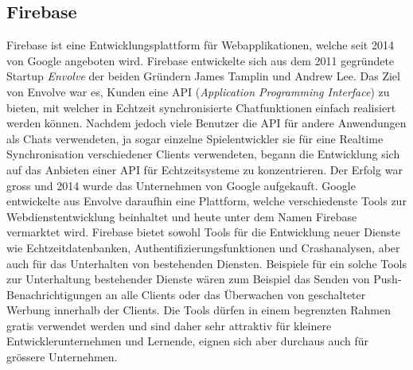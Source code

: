 \documentclass[../main.tex]{subfiles}
\begin{document}
	\subsection{Firebase} \label{DieFirebaseDatenbank}
	Firebase ist eine  Entwicklungsplattform für Webapplikationen, welche seit 2014 von Google angeboten wird. Firebase entwickelte sich aus dem 2011 gegründete Startup \emph{Envolve} der beiden Gründern James Tamplin und Andrew Lee. Das Ziel von Envolve war es, Kunden eine API (\emph{Application Programming Interface}) zu bieten, mit welcher in Echtzeit synchronisierte Chatfunktionen einfach realisiert werden können. Nachdem jedoch viele Benutzer die API für andere Anwendungen als Chats verwendeten, ja sogar einzelne Spielentwickler sie für eine Realtime Synchronisation verschiedener Clients verwendeten, begann die Entwicklung sich auf das Anbieten einer API für Echtzeitsysteme zu konzentrieren. Der Erfolg war gross und 2014 wurde das Unternehmen von Google aufgekauft. Google entwickelte aus Envolve daraufhin eine Plattform, welche verschiedenste Tools zur Webdienstentwicklung beinhaltet und heute unter dem Namen Firebase vermarktet wird. Firebase bietet sowohl Tools für die Entwicklung neuer Dienste wie Echtzeitdatenbanken, Authentifizierungsfunktionen und Crashanalysen, aber auch für das Unterhalten von bestehenden Diensten. Beispiele für ein solche Tools zur Unterhaltung bestehender Dienste wären zum Beispiel das Senden von Push-Benachrichtigungen an alle Clients oder das Überwachen von geschalteter Werbung innerhalb der Clients. Die Tools dürfen in einem begrenzten Rahmen gratis verwendet werden und sind daher sehr attraktiv für kleinere Entwicklerunternehmen und Lernende, eignen sich aber durchaus auch für grössere Unternehmen.\cite{Firebase}
	
\end{document}
